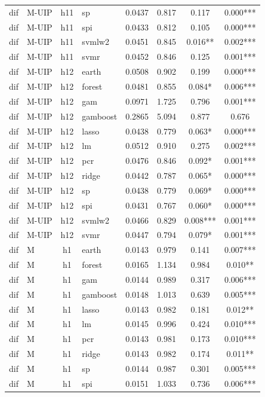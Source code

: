 \begin{ThreePartTable}
\begin{longtable}[t]{llclcccc}
dif & M-UIP & h11 & sp & 0.0437 & 0.817 & 0.117 & 0.000***\\
dif & M-UIP & h11 & spi & 0.0433 & 0.812 & 0.105 & 0.000***\\
dif & M-UIP & h11 & svmlw2 & 0.0451 & 0.845 & 0.016** & 0.002***\\
dif & M-UIP & h11 & svmr & 0.0452 & 0.846 & 0.125 & 0.001***\\
\addlinespace
dif & M-UIP & h12 & earth & 0.0508 & 0.902 & 0.199 & 0.000***\\
dif & M-UIP & h12 & forest & 0.0481 & 0.855 & 0.084* & 0.006***\\
dif & M-UIP & h12 & gam & 0.0971 & 1.725 & 0.796 & 0.001***\\
dif & M-UIP & h12 & gamboost & 0.2865 & 5.094 & 0.877 & 0.676\\
dif & M-UIP & h12 & lasso & 0.0438 & 0.779 & 0.063* & 0.000***\\
dif & M-UIP & h12 & lm & 0.0512 & 0.910 & 0.275 & 0.002***\\
dif & M-UIP & h12 & pcr & 0.0476 & 0.846 & 0.092* & 0.001***\\
dif & M-UIP & h12 & ridge & 0.0442 & 0.787 & 0.065* & 0.000***\\
dif & M-UIP & h12 & sp & 0.0438 & 0.779 & 0.069* & 0.000***\\
dif & M-UIP & h12 & spi & 0.0431 & 0.767 & 0.060* & 0.000***\\
dif & M-UIP & h12 & svmlw2 & 0.0466 & 0.829 & 0.008*** & 0.001***\\
dif & M-UIP & h12 & svmr & 0.0447 & 0.794 & 0.079* & 0.001***\\
\addlinespace
dif & M & h1 & earth & 0.0143 & 0.979 & 0.141 & 0.007***\\
dif & M & h1 & forest & 0.0165 & 1.134 & 0.984 & 0.010**\\
dif & M & h1 & gam & 0.0144 & 0.989 & 0.317 & 0.006***\\
dif & M & h1 & gamboost & 0.0148 & 1.013 & 0.639 & 0.005***\\
dif & M & h1 & lasso & 0.0143 & 0.982 & 0.181 & 0.012**\\
dif & M & h1 & lm & 0.0145 & 0.996 & 0.424 & 0.010***\\
dif & M & h1 & pcr & 0.0143 & 0.981 & 0.173 & 0.010***\\
dif & M & h1 & ridge & 0.0143 & 0.982 & 0.174 & 0.011**\\
dif & M & h1 & sp & 0.0144 & 0.987 & 0.301 & 0.005***\\
dif & M & h1 & spi & 0.0151 & 1.033 & 0.736 & 0.006***\\

\end{longtable}
\end{ThreePartTable}
